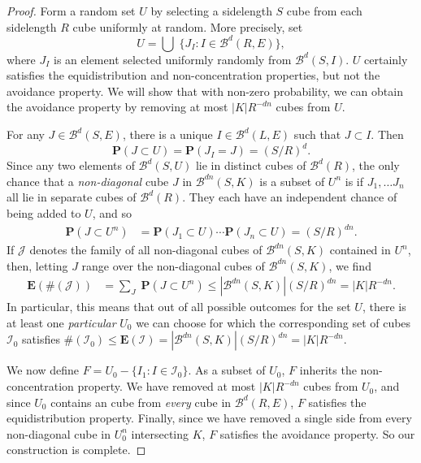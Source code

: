 \documentclass[usenames,dvipsnames]{article}
\theoremstyle{plain}
\theoremstyle{plain}
\begin{document}
\begin{proof}
	Form a random set $U$ by selecting a sidelength $S$ cube from each sidelength $R$ cube uniformly at random. More precisely, set
	\[ U = \bigcup\; \{ J_I: I \in \mathcal{B}^d(R,E) \}, \]
	where $J_I$ is an element selected uniformly randomly from $\mathcal{B}^d(S,I)$. $U$ certainly satisfies the equidistribution and non-concentration properties, but not the avoidance property. We will show that with non-zero probability, we can obtain the avoidance property by removing at most $|K|R^{-dn}$ cubes from $U$.

	For any $J \in \mathcal{B}^d(S,E)$, there is a unique $I \in \mathcal{B}^d(L,E)$ such that $J \subset I$. Then
	\[ \mathbf{P}(J \subset U) = \mathbf{P}(J_I = J) = (S/R)^d. \]
	Since any two elements of $\mathcal{B}^d(S,U)$ lie in distinct cubes of $\mathcal{B}^d(R)$, the only chance that a {\it non-diagonal} cube $J$ in $\mathcal{B}^{dn}(S,K)$ is a subset of $U^n$ is if $J_1, \dots J_n$ all lie in separate cubes of $\mathcal{B}^d(R)$. They each have an independent chance of being added to $U$, and so
	\begin{align*}
		\mathbf{P}(J \subset U^n) &= \mathbf{P}(J_1 \subset U) \cdots \mathbf{P}(J_n \subset U) = (S/R)^{dn}.
	\end{align*}
	If $\mathcal{J}$ denotes the family of all non-diagonal cubes of $\mathcal{B}^{dn}(S,K)$ contained in $U^n$, then, letting $J$ range over the non-diagonal cubes of $\mathcal{B}^{dn}(S,K)$, we find
	\begin{align*}
		\mathbf{E}(\# (\mathcal{J})) &= {\sum}_J\; \mathbf{P}(J \subset U^n) \leq |\mathcal{B}^{dn}(S,K)| (S/R)^{dn} = |K| R^{-dn}.
	\end{align*}
	In particular, this means that out of all possible outcomes for the set $U$, there is at least one {\it particular} $U_0$ we can choose for which the corresponding set of cubes $\mathcal{I}_0$ satisfies $\#(\mathcal{I}_0) \leq \mathbf{E}(\mathcal{I}) = |\mathcal{B}^{dn}(S,K)| (S/R)^{dn} = |K| R^{-dn}$.

	We now define $F = U_0 - \{ I_1 : I \in \mathcal{I}_0 \}$. As a subset of $U_0$, $F$ inherits the non-concentration property. We have removed at most $|K| R^{-dn}$ cubes from $U_0$, and since $U_0$ contains an cube from {\it every} cube in $\mathcal{B}^d(R,E)$, $F$ satisfies the equidistribution property. Finally, since we have removed a single side from every non-diagonal cube in $U_0^n$ intersecting $K$, $F$ satisfies the avoidance property. So our construction is complete.
\end{proof}
\end{document}
